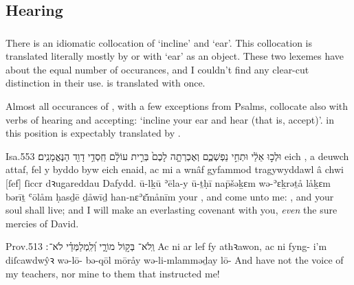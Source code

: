 \subsection{Hearing}

\subsubsection{}

\subsubsection{}


\begin{paper}
	There is an idiomatic collocation of  ‘incline’ and  ‘ear’. This collocation is translated literally mostly by  or  with  ‘ear’ as an object. These two lexemes have about the equal number of occurances, and I couldn’t find any clear-cut distinction in their use.  is translated with  once.

	Almost all occurances of , with a few exceptions from Psalms, collocate also with verbs of hearing and accepting: ‘incline your ear and hear (that is, accept)’.  in this position is expectably translated by .
\end{paper}

\begin{example}{Isa.}{55}{3}{}{}
	\quoling
	{  וּלְכ֣וּ אֵלַ֔י  וּתְחִ֣י נַפְשְׁכֶ֑ם וְאֶכְרְתָ֤ה לָכֶם֙ בְּרִ֣ית עוֹלָ֔ם חַֽסְדֵ֥י דָוִ֖ד הַנֶּאֱמָנִֽים׃}
	{ eich , a deuwch attaf,  fel y byddo byw eich enaid, ac mi a wnâf gyfammod tragywyddawl â chwi [ſef] ſiccr dꝛugareddau Dafydd.}
	{  ū-lḵū ʾēla-y  ū-ṯḥī nap̄šəḵɛm wə-ʾɛḵrəṯå låḵɛm bərīṯ ʿōlåm ḥasḏē ḏåwīḏ han-nɛʾɛ̆månīm}
	{ your , and come unto me: , and your soul shall live; and I will make an everlasting covenant with you, \textit{even} the sure mercies of David.}
\end{example}

\begin{example}{Prov.}{5}{13}{}{}
	\quoling
	{וְֽלֹא־ בְּק֣וֹל מוֹרָ֑י וְ֝לִֽמְלַמְּדַ֗י לֹא־ ׃}
	{Ac ni  ar lef fy athꝛawon, ac ni  fyng- i’m diſcawdwŷꝛ}
	{wə-lō- bə-qōl mōråy wə-li-mlamməḏay lō- }
	{And have not  the voice of my teachers, nor  mine  to them that instructed me!}
\end{example}




